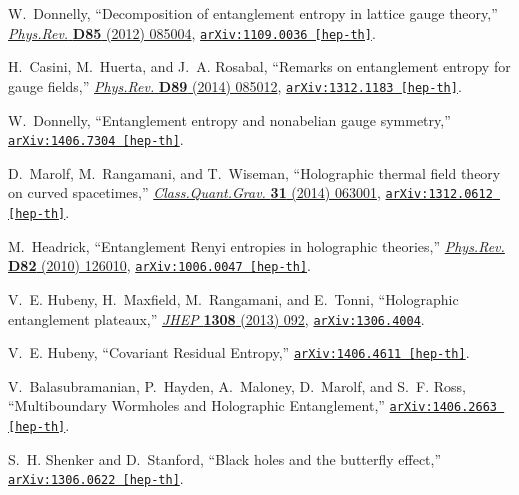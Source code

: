 \documentclass[12pt]{article}
\begin{document}
\begin{thebibliography}{10}
W.~Donnelly, ``{Decomposition of entanglement entropy in lattice gauge
  theory},'' \href{http://dx.doi.org/10.1103/PhysRevD.85.085004}{{\em
  Phys.Rev.} {\bf D85} (2012)  085004},
\href{http://arxiv.org/abs/1109.0036}{{\tt arXiv:1109.0036 [hep-th]}}.

H.~Casini, M.~Huerta, and J.~A. Rosabal, ``{Remarks on entanglement entropy for
  gauge fields},'' \href{http://dx.doi.org/10.1103/PhysRevD.89.085012}{{\em
  Phys.Rev.} {\bf D89} (2014)  085012},
\href{http://arxiv.org/abs/1312.1183}{{\tt arXiv:1312.1183 [hep-th]}}.

W.~Donnelly, ``{Entanglement entropy and nonabelian gauge symmetry},''
\href{http://arxiv.org/abs/1406.7304}{{\tt arXiv:1406.7304 [hep-th]}}.

D.~Marolf, M.~Rangamani, and T.~Wiseman, ``{Holographic thermal field theory on
  curved spacetimes},''
  \href{http://dx.doi.org/10.1088/0264-9381/31/6/063001}{{\em
  Class.Quant.Grav.} {\bf 31} (2014)  063001},
\href{http://arxiv.org/abs/1312.0612}{{\tt arXiv:1312.0612 [hep-th]}}.

M.~Headrick, ``{Entanglement Renyi entropies in holographic theories},''
  \href{http://dx.doi.org/10.1103/PhysRevD.82.126010}{{\em Phys.Rev.} {\bf D82}
  (2010)  126010},
\href{http://arxiv.org/abs/1006.0047}{{\tt arXiv:1006.0047 [hep-th]}}.

V.~E. Hubeny, H.~Maxfield, M.~Rangamani, and E.~Tonni, ``{Holographic
  entanglement plateaux},''
  \href{http://dx.doi.org/10.1007/JHEP08(2013)092}{{\em JHEP} {\bf 1308} (2013)
   092},
\href{http://arxiv.org/abs/1306.4004}{{\tt arXiv:1306.4004}}.

V.~E. Hubeny, ``{Covariant Residual Entropy},''
\href{http://arxiv.org/abs/1406.4611}{{\tt arXiv:1406.4611 [hep-th]}}.

V.~Balasubramanian, P.~Hayden, A.~Maloney, D.~Marolf, and S.~F. Ross,
  ``{Multiboundary Wormholes and Holographic Entanglement},''
\href{http://arxiv.org/abs/1406.2663}{{\tt arXiv:1406.2663 [hep-th]}}.

S.~H. Shenker and D.~Stanford, ``{Black holes and the butterfly effect},''
\href{http://arxiv.org/abs/1306.0622}{{\tt arXiv:1306.0622 [hep-th]}}.


\end{thebibliography}
\end{document}
